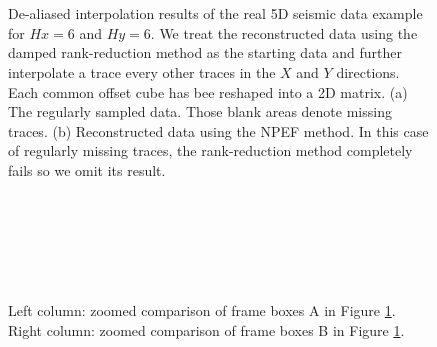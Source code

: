 {\begin{figure}[htb!]
    \centering
   \subfloat[]{\texttt{[image: real5d\_smaller/Fig/real\_obs5d\_new-3-0]}
    \label{fig:ra_obs5d}}\\
    \\
	\caption{De-aliased interpolation results of the real 5D seismic data example for $Hx=6$ and $Hy=6$. We treat the reconstructed data using the damped rank-reduction method as the starting data and further interpolate a trace every other traces in the $X$ and $Y$ directions. Each common offset cube has bee reshaped into a 2D matrix. (a) The regularly sampled data. Those blank areas denote missing traces. (b) Reconstructed data using the NPEF method. In this case of regularly missing traces, the rank-reduction method completely fails so we omit its result.}
	\label{fig:ra_obs5d,ra_npef5d}
\end{figure}

\begin{figure}[htb!]
    \centering
    \\
    \\
	\caption{}
	\label{fig:ra_obs5d_new-3fk,ra_npef5d_new-3fk}
\end{figure}

\begin{figure}[htb!]
    \centering
    \\
    \\
	\caption{Left column: zoomed comparison of frame boxes A in Figure \ref{fig:ra_obs5d,ra_npef5d}. Right column: zoomed comparison of frame boxes B in Figure \ref{fig:ra_obs5d,ra_npef5d}.}
	\label{fig:ra_obs5da,ra_npef5da,ra_obs5db,ra_npef5db}
\end{figure}

}
